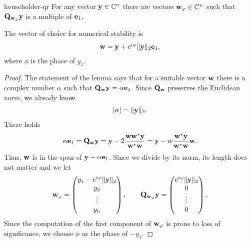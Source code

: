\begin{Lemma}{householder-qr}
  For any vector $\mathbf y\in\mathbb C^n$ there are vectors $\mathbf w_\varphi\in\mathbb C^n$ such
  that $\mathbf Q_{\mathbf w_\varphi} \mathbf y$ is a multiple of $\mathbf e_1$.

  The vector of choice for numerical stability is
  \begin{gather}
    \mathbf w = \mathbf y + e^{i\varphi} \lVert\mathbf y\rVert_2\mathbf e_1,
  \end{gather}
  where $\phi$ is the phase of $y_1$.
\end{Lemma}

\begin{proof}
  The statement of the lemma says that for a suitable vector $\mathbf w$ there is a complex number
  $\alpha$ such that $\mathbf Q_{\mathbf w} \mathbf y = \alpha \mathbf e_1$. Since
  $\mathbf Q_{\mathbf w}$ preserves the Euclidean norm, we already know
  \begin{gather}
    \lvert\alpha\rvert = \lVert\mathbf y\rVert_2.
  \end{gather}
  There holds
  \begin{gather}
    \alpha\mathbf e_1 = \mathbf Q_{\mathbf w} \mathbf y
    = \mathbf y - 2 \frac{\mathbf w\mathbf w^*\mathbf y}{\mathbf w^*\mathbf w}
    = \mathbf y - w \frac{\mathbf w^*\mathbf y}{\mathbf w^*\mathbf w}\mathbf w.
  \end{gather}
  Thus, $\mathbf w$ is in the span of $\mathbf y-\alpha \mathbf e_1$. Since we divide by
  its norm, its length does not matter and we let
  \begin{gather}
    \mathbf w_\varphi =
    \begin{pmatrix}
      y_1 - e^{i\varphi} \lVert\mathbf y\rVert_2\\y_2\\\vdots\\y_n
    \end{pmatrix},
    \qquad
    \mathbf Q_{\mathbf w_\varphi}\mathbf y =
    \begin{pmatrix}
      e^{i\varphi} \lVert\mathbf y\rVert_2\\0\\\vdots\\0
    \end{pmatrix}.
  \end{gather}
  Since the computation of the first component of $\mathbf w_\varphi$ is prone to loss of significance, we choose $\phi$ as the phase of $-y_1$.
\end{proof}

